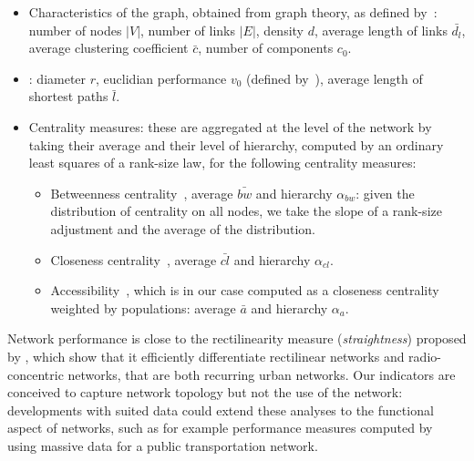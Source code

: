 
\begin{itemize}
\item Characteristics of the graph, obtained from graph theory, as defined by~\cite{haggett1970network}: number of nodes $\left|V\right|$, number of links $\left|E\right|$, density $d$, average length of links $\bar{d_l}$, average clustering coefficient $\bar{c}$, number of components $c_0$.
\item {}: diameter $r$, euclidian performance $v_0$ (defined by~\cite{banos2012towards}), average length of shortest paths $\bar{l}$.
\item Centrality measures: these are aggregated at the level of the network by taking their average and their level of hierarchy, computed by an ordinary least squares of a rank-size law, for the following centrality measures:
\begin{itemize}
\item Betweenness centrality~\citep{crucitti2006centrality}, average $\bar{bw}$ and hierarchy $\alpha_{bw}$: given the distribution of centrality on all nodes, we take the slope of a rank-size adjustment and the average of the distribution.
\item Closeness centrality~\citep{crucitti2006centrality}, average $\bar{cl}$ and hierarchy $\alpha_{cl}$.
\item Accessibility~\citep{hansen1959accessibility}, which is in our case computed as a closeness centrality weighted by populations: average $\bar{a}$ and hierarchy $\alpha_{a}$.
\end{itemize}
\end{itemize}

Network performance is close to the rectilinearity measure (\emph{straightness}) proposed by \cite{josselin2016straightness}, which show that it efficiently differentiate rectilinear networks and radio-concentric networks, that are both recurring urban networks. Our indicators are conceived to capture network topology but not the use of the network: developments with suited data could extend these analyses to the functional aspect of networks, such as for example performance measures computed by~\cite{trepanier2009calculation} using massive data for a public transportation network.




